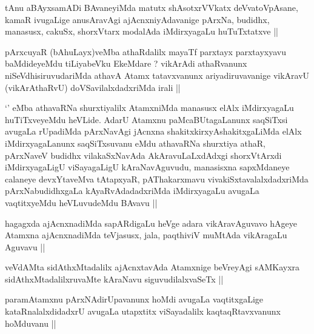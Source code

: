 
\begin{artha}
tAnu aBAyxsamADi BAvaneyiMda matutx shAsotxrVVkatx deVvatoVpAsane,
kamaR ivugaLige anusAravAgi ajAcnxniyAdavanige pArxNa, budidhx,
manasusx, cakuSx, shorxVtarx modalAda iMdirxyagaLu huTuTxtatxve ||
\end{artha}


\begin{artha}
pArxcuyaR (bAhuLayx)veMba athaRdalilx mayaTf parxtayx parxtayxyavu
baMdideyeMdu tiLiyabeVku EkeMdare ? vikArAdi athaRvanunx
niSeVdhisiruvudariMda athavA Atamx tatavxvanunx ariyadiruvavanige
vikAravU (vikArAthaRvU) doVSavilalxdadxriMda irali ||
\end{artha}

\begin{artha}
`\stext' eMba athavaRNa shurxtiyalilx AtamxniMda manasusx elAlx
  iMdirxyagaLu huTiTxveyeMdu heVLide. AdarU Atamxnu paMcaBUtagaLanunx
  saqSiTxsi avugaLa rUpadiMda pArxNavAgi jAcnxna
  shakitxkirxyAshakitxgaLiMda elAlx iMdirxyagaLanunx saqSiTxsuvanu
  eMdu athavaRNa shurxtiya athaR, pArxNaveV budidhx vilakaSxNavAda
  AkAravuLaLxdAdxgi shorxVtArxdi iMdirxyagaLigU viSayagaLigU
  kAraNavAguvudu, manasisxna sapxMdaneye calaneye devxYtaveMva
  tAtapxyaR, pAThakarxmavu vivakiSxtavalalxdadxriMda pArxNabudidhxgaLa
  kAyaRvAdadadxriMda iMdirxyagaLu avugaLa vaqtitxyeMdu heVLuvudeMdu
  BAvavu ||
\end{artha}

\begin{artha}
hagagxda ajAcnxnadiMda sapARdigaLu heVge adara vikAravAguvavo hAgeye
Atamxna ajAcnxnadiMda teVjasusx, jala, paqthiviV muMtAda vikAragaLu
Aguvavu ||
\end{artha}


\begin{artha}
veVdAMta sidAthxMtadalilx ajAcnxtavAda Atamxnige beVreyAgi sAMKayxra
sidAthxMtadalilxruvaMte kAraNavu siguvudilalxvaSeTx ||
\end{artha}


\begin{artha}
paramAtamxnu pArxNAdirUpavanunx hoMdi avugaLa vaqtitxgaLige
kataRnalalxdidadxrU avugaLa utapxtitx viSayadalilx kaqtaqRtavxvanunx
hoMduvanu ||
\end{artha}

